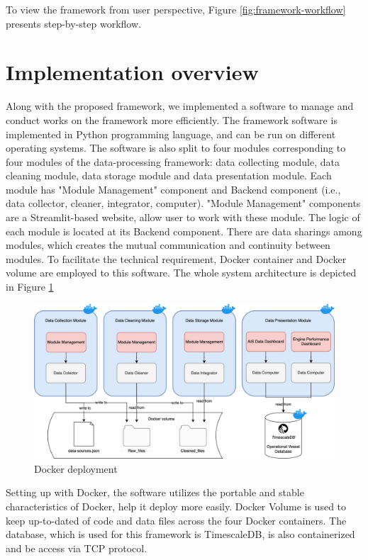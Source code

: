 To view the framework from user perspective, Figure \ref{fig:framework-workflow} presents step-by-step workflow. 

\section{Implementation overview}
\label{chap:design:software}
Along with the proposed framework, we implemented a software to manage and conduct works on the framework more efficiently. 
The framework software is implemented in Python programming language, and can be run on different operating systems. The software is also split to four modules corresponding to four modules of the data-processing framework: data collecting module, data cleaning module, data storage module and data presentation module. Each module has "Module Management" component and Backend component (i.e., data collector, cleaner, integrator, computer). "Module Management" components are a Streamlit-based website, allow user to work with these module. The logic of each module is located at its Backend component.
There are data sharings among modules, which creates the mutual communication and continuity between modules. To facilitate the technical requirement, Docker container and Docker volume are employed to this software. 
The whole system architecture is depicted in Figure \ref{fig:software-architecture}


\begin{figure}[H]
    \centering
    \includegraphics[width=1.0\linewidth]{studentWorkTemplate_en/figures/mt-222100012-system-architecture.drawio.png}
    \caption{Docker deployment}
    \label{fig:software-architecture}
\end{figure}

Setting up with Docker, the software utilizes the portable and stable characteristics of Docker, help it deploy more easily. Docker Volume is used to keep up-to-dated of code and data files across the four Docker containers. 
The database, which is used for this framework is TimescaleDB, is also containerized and be access via TCP protocol. 


